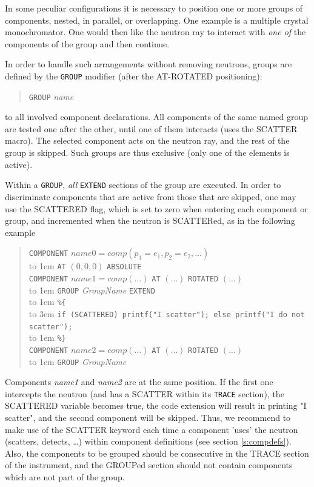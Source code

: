 In some peculiar configurations it is necessary to position one or more groups
of components, nested, in parallel, or overlapping. One example is a multiple
crystal monochromator. One would then like the neutron ray to interact with
\emph{one of} the components of the group and then continue.

In order to handle such arrangements without removing neutrons, groups are
defined by the \texttt{GROUP} modifier (after the AT-ROTATED positioning):
\begin{quote}
  \texttt{GROUP} \textit{name}
\end{quote}
to all involved component declarations.  All components of
the same named group are tested one after the other, until one of them interacts
(uses the SCATTER macro). The selected component
acts on the neutron ray, and the rest of the group is skipped. Such groups are
thus exclusive (only one of the elements is active).

Within a \texttt{GROUP}, \emph{all} \texttt{EXTEND} sections of the group are
executed. In order to discriminate components that are active from those that
are skipped, one may use the SCATTERED flag, which is set to zero when entering
each component or group, and incremented when the neutron is SCATTERed, as in
the following example 
\begin{quote}
  \texttt{COMPONENT} $\textit{name0} =
    \textit{comp}(p_1 = e_1, p_2 = e_2, \ldots)$ \\
    \hbox to 1em{} \texttt{AT} $(0,0,0)$ \texttt{ABSOLUTE} \\
  \texttt{COMPONENT} $\textit{name1} =
    \textit{comp}(\ldots)$ \texttt{AT} $(...)$  \texttt{ROTATED} $(...)$ \\
  \hbox to 1em{} \texttt{GROUP} \textit{GroupName} \texttt{EXTEND} \\
  \hbox to 1em{} \verb|%{| \\
  \hbox to 3em{} \verb+if (SCATTERED) printf("I scatter"); else printf("I do not scatter");+\\
  \hbox to 1em{} \verb|%}| \\
  \texttt{COMPONENT} $\textit{name2} =
    \textit{comp}(\ldots)$ \texttt{AT} $(...)$ \texttt{ROTATED} $(...)$ \\
  \hbox to 1em{} \texttt{GROUP} \textit{GroupName}
\end{quote}
Components \emph{name1} and \emph{name2} are at the same position. If the first
one intercepts the neutron (and has a SCATTER within its \texttt{TRACE}
section), the SCATTERED variable becomes true, the code extension will result in
printing "I scatter", and the second component will be skipped.  Thus, we
recommend to make use of the SCATTER keyword each time a component 'uses' the
neutron (scatters, detects, \ldots) within component definitions (see section
\ref{s:compdefs}). Also, the components to be grouped should be consecutive in
the TRACE section of the instrument, and the GROUPed section should not contain
components which are not part of the group.

